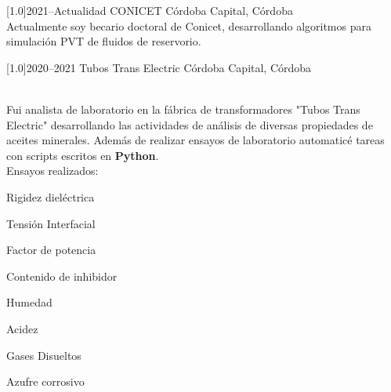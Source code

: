 \documentclass[espanol]{cv-style}     %
\begin{document}
\begin{entrylist}
\entry
  {\scalebox{.7}[1.0]{2021--Actualidad}}
  {CONICET}
  {Córdoba Capital, Córdoba}
  {\\
	  Actualmente soy becario doctoral de Conicet, desarrollando algoritmos para simulación PVT de fluidos de reservorio.
  }

\entry
  {\scalebox{.7}[1.0]{2020--2021}}
  {Tubos Trans Electric}
  {Córdoba Capital, Córdoba}
  {\\
	  Fui analista de laboratorio en la fábrica de transformadores {"Tubos Trans Electric"} desarrollando las actividades de análisis de diversas propiedades de aceites minerales. Además de realizar ensayos de laboratorio automaticé tareas con scripts escritos en \textbf{Python}. \\
  Ensayos realizados:
  \begin{itemize}\small{
      \item Rigidez dieléctrica
      \item Tensión Interfacial
      \item Factor de potencia
      \item Contenido de inhibidor
      \item Humedad
      \item Acidez
      \item Gases Disueltos
      \item Azufre corrosivo}
  \end{itemize}
  }


\end{entrylist}
\end{document}
